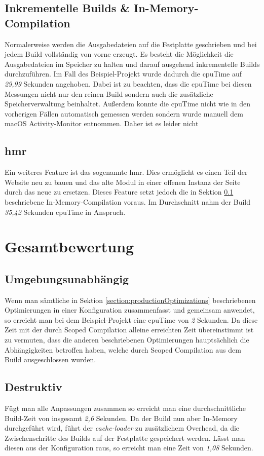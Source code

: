 \documentclass[11pt]{report}
\begin{document}
    		\subsection{Inkrementelle Builds \& In-Memory-Compilation}
    			\label{section:incrementalBuilds}
    			Normalerweise werden die Ausgabedateien auf die Festplatte geschrieben und bei jedem Build vollständig von vorne erzeugt. Es besteht die Möglichkeit die Ausgabedateien im Speicher zu halten und darauf ausgehend inkrementelle Builds durchzuführen. Im Fall des Beispiel-Projekt wurde dadurch die \Gls{cpuTime} auf \emph{29,99} Sekunden angehoben. Dabei ist zu beachten, dass die \Gls{cpuTime} bei diesen Messungen nicht nur den reinen Build sondern auch die zusätzliche Speicherverwaltung beinhaltet. Außerdem konnte die \Gls{cpuTime} nicht wie in den vorherigen Fällen automatisch gemessen werden sondern wurde manuell dem macOS Activity-Monitor entnommen. Daher ist es leider nicht 

    		\subsection{\Gls{hmr}}
    			Ein weiteres Feature ist das sogenannte \Gls{hmr}. Dies ermöglicht es einen Teil der Website neu zu bauen und das alte Modul in einer offenen Instanz der Seite durch das neue zu ersetzen. Dieses Feature setzt jedoch die in Sektion \ref{section:incrementalBuilds} beschriebene In-Memory-Compilation voraus. Im Durchschnitt nahm der Build \emph{35,42} Sekunden \Gls{cpuTime} in Anspruch.

		\section{Gesamtbewertung}
			\subsection{Umgebungsunabhängig}
				Wenn man sämtliche in Sektion \ref{section:productionOptimizations} beschriebenen Optimierungen in einer Konfiguration zusammenfasst und gemeinsam anwendet, so erreicht man bei dem Beispiel-Projekt eine \Gls{cpuTime} von \emph{2} Sekunden. Da diese Zeit mit der durch Scoped Compilation alleine erreichten Zeit übereinstimmt ist zu vermuten, dass die anderen beschriebenen Optimierungen hauptsächlich die Abhängigkeiten betroffen haben, welche durch Scoped Compilation aus dem Build ausgeschlossen wurden.
			\subsection{Destruktiv}
				Fügt man alle Anpassungen zusammen so erreicht man eine durchschnittliche Build-Zeit von insgesamt \emph{2,6} Sekunden. Da der Build nun aber In-Memory durchgeführt wird, führt der \emph{cache-loader} zu zusätzlichem Overhead, da die Zwischenschritte des Builds auf der Festplatte gespeichert werden. Lässt man diesen aus der Konfiguration raus, so erreicht man eine Zeit von \emph{1,08} Sekunden.
\end{document}
